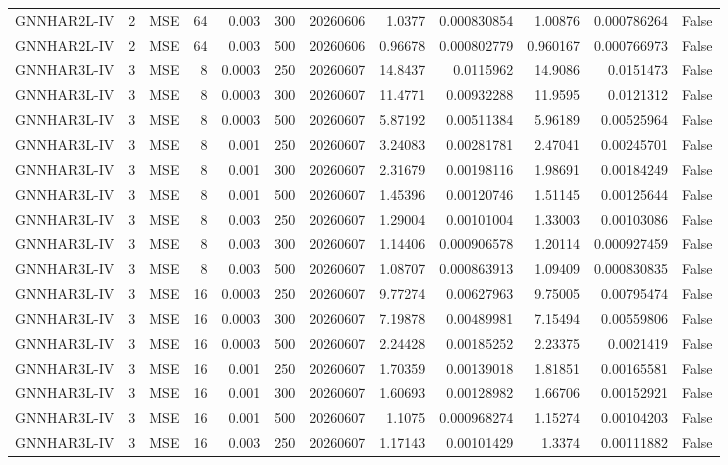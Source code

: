 \begin{tabular}{lrlrrrrrrrrr}
GNNHAR2L-IV & 2 & MSE & 64 & 0.003 & 300 & 20260606 & 1.0377 & 0.000830854 & 1.00876 & 0.000786264 & False \\
GNNHAR2L-IV & 2 & MSE & 64 & 0.003 & 500 & 20260606 & 0.96678 & 0.000802779 & 0.960167 & 0.000766973 & False \\
GNNHAR3L-IV & 3 & MSE & 8 & 0.0003 & 250 & 20260607 & 14.8437 & 0.0115962 & 14.9086 & 0.0151473 & False \\
GNNHAR3L-IV & 3 & MSE & 8 & 0.0003 & 300 & 20260607 & 11.4771 & 0.00932288 & 11.9595 & 0.0121312 & False \\
GNNHAR3L-IV & 3 & MSE & 8 & 0.0003 & 500 & 20260607 & 5.87192 & 0.00511384 & 5.96189 & 0.00525964 & False \\
GNNHAR3L-IV & 3 & MSE & 8 & 0.001 & 250 & 20260607 & 3.24083 & 0.00281781 & 2.47041 & 0.00245701 & False \\
GNNHAR3L-IV & 3 & MSE & 8 & 0.001 & 300 & 20260607 & 2.31679 & 0.00198116 & 1.98691 & 0.00184249 & False \\
GNNHAR3L-IV & 3 & MSE & 8 & 0.001 & 500 & 20260607 & 1.45396 & 0.00120746 & 1.51145 & 0.00125644 & False \\
GNNHAR3L-IV & 3 & MSE & 8 & 0.003 & 250 & 20260607 & 1.29004 & 0.00101004 & 1.33003 & 0.00103086 & False \\
GNNHAR3L-IV & 3 & MSE & 8 & 0.003 & 300 & 20260607 & 1.14406 & 0.000906578 & 1.20114 & 0.000927459 & False \\
GNNHAR3L-IV & 3 & MSE & 8 & 0.003 & 500 & 20260607 & 1.08707 & 0.000863913 & 1.09409 & 0.000830835 & False \\
GNNHAR3L-IV & 3 & MSE & 16 & 0.0003 & 250 & 20260607 & 9.77274 & 0.00627963 & 9.75005 & 0.00795474 & False \\
GNNHAR3L-IV & 3 & MSE & 16 & 0.0003 & 300 & 20260607 & 7.19878 & 0.00489981 & 7.15494 & 0.00559806 & False \\
GNNHAR3L-IV & 3 & MSE & 16 & 0.0003 & 500 & 20260607 & 2.24428 & 0.00185252 & 2.23375 & 0.0021419 & False \\
GNNHAR3L-IV & 3 & MSE & 16 & 0.001 & 250 & 20260607 & 1.70359 & 0.00139018 & 1.81851 & 0.00165581 & False \\
GNNHAR3L-IV & 3 & MSE & 16 & 0.001 & 300 & 20260607 & 1.60693 & 0.00128982 & 1.66706 & 0.00152921 & False \\
GNNHAR3L-IV & 3 & MSE & 16 & 0.001 & 500 & 20260607 & 1.1075 & 0.000968274 & 1.15274 & 0.00104203 & False \\
GNNHAR3L-IV & 3 & MSE & 16 & 0.003 & 250 & 20260607 & 1.17143 & 0.00101429 & 1.3374 & 0.00111882 & False \\

\end{tabular}
